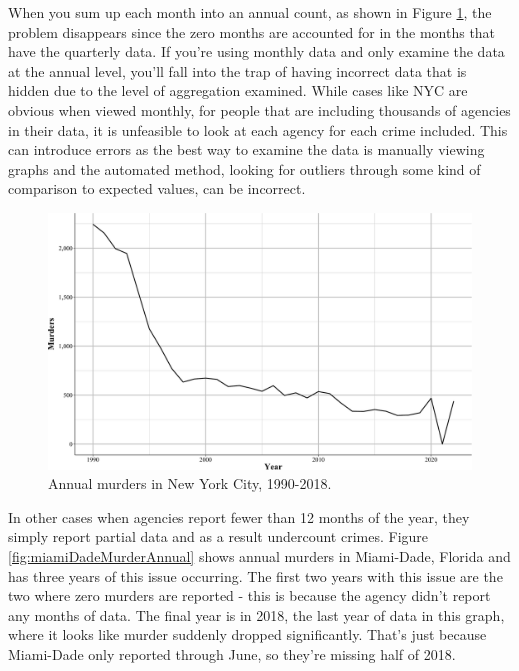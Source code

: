 \documentclass[
  12pt,
  openany]{book}
\begin{document}
When you sum up each month into an annual count, as shown in Figure \ref{fig:nycMurderYearly}, the problem disappears since the zero months are accounted for in the months that have the quarterly data. If you're using monthly data and only examine the data at the annual level, you'll fall into the trap of having incorrect data that is hidden due to the level of aggregation examined. While cases like NYC are obvious when viewed monthly, for people that are including thousands of agencies in their data, it is unfeasible to look at each agency for each crime included. This can introduce errors as the best way to examine the data is manually viewing graphs and the automated method, looking for outliers through some kind of comparison to expected values, can be incorrect.

\begin{figure}
\centering
\includegraphics{ucrbook_files/figure-latex/nycMurderYearly-1.pdf}
\caption{\label{fig:nycMurderYearly}Annual murders in New York City, 1990-2018.}
\end{figure}

In other cases when agencies report fewer than 12 months of the year, they simply report partial data and as a result undercount crimes. Figure \ref{fig:miamiDadeMurderAnnual} shows annual murders in Miami-Dade, Florida and has three years of this issue occurring. The first two years with this issue are the two where zero murders are reported - this is because the agency didn't report any months of data. The final year is in 2018, the last year of data in this graph, where it looks like murder suddenly dropped significantly. That's just because Miami-Dade only reported through June, so they're missing half of 2018.
\end{document}
